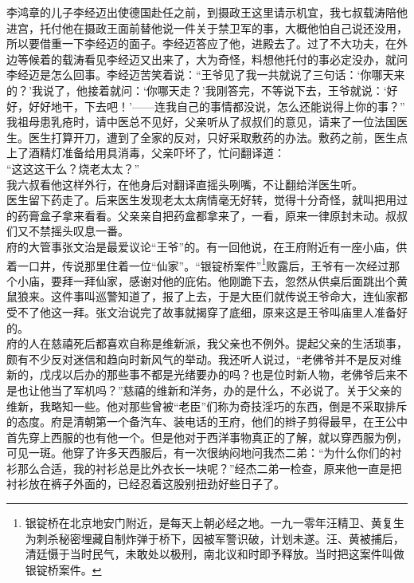 李鸿章的儿子李经迈出使德国赴任之前，到摄政王这里请示机宜，我七叔载涛陪他进宫，托付他在摄政王面前替他说一件关于禁卫军的事，大概他怕自己说还没用，所以要借重一下李经迈的面子。李经迈答应了他，进殿去了。过了不大功夫，在外边等候着的载涛看见李经迈又出来了，大为奇怪，料想他托付的事必定没办，就问李经迈是怎么回事。李经迈苦笑着说：“王爷见了我一共就说了三句话：‘你哪天来的？’我说了，他接着就问：‘你哪天走？’我刚答完，不等说下去，王爷就说：‘好好，好好地干，下去吧！’——连我自己的事情都没说，怎么还能说得上你的事？”\\

我祖母患乳疮时，请中医总不见好，父亲听从了叔叔们的意见，请来了一位法国医生。医生打算开刀，遭到了全家的反对，只好采取敷药的办法。敷药之前，医生点上了酒精灯准备给用具消毒，父亲吓坏了，忙问翻译道：\\

“这这这干么？烧老太太？”\\

我六叔看他这样外行，在他身后对翻译直摇头咧嘴，不让翻给洋医生听。\\

医生留下药走了。后来医生发现老太太病情毫无好转，觉得十分奇怪，就叫把用过的药膏盒子拿来看看。父亲亲自把药盒都拿来了，一看，原来一律原封未动。叔叔们又不禁摇头叹息一番。\\

府的大管事张文治是最爱议论“王爷”的。有一回他说，在王府附近有一座小庙，供着一口井，传说那里住着一位“仙家”。“银锭桥案件”\footnote{银锭桥在北京地安门附近，是每天上朝必经之地。一九一零年汪精卫、黄复生为刺杀秘密埋藏自制炸弹于桥下，因被军警识破，计划未遂。汪、黄被捕后，清廷慑于当时民气，未敢处以极刑，南北议和时即予释放。当时把这案件叫做银锭桥案件。
}败露后，王爷有一次经过那个小庙，要拜一拜仙家，感谢对他的庇佑。他刚跪下去，忽然从供桌后面跳出个黄鼠狼来。这件事叫巡警知道了，报了上去，于是大臣们就传说王爷命大，连仙家都受不了他这一拜。张文治说完了故事就揭穿了底细，原来这是王爷叫庙里人准备好的。\\

府的人在慈禧死后都喜欢自称是维新派，我父亲也不例外。提起父亲的生活琐事，颇有不少反对迷信和趋向时新风气的举动。我还听人说过，“老佛爷并不是反对维新的，戊戌以后办的那些事不都是光绪要办的吗？也是位时新人物，老佛爷后来不是也让他当了军机吗？”慈禧的维新和洋务，办的是什么，不必说了。关于父亲的维新，我略知一些。他对那些曾被“老臣”们称为奇技淫巧的东西，倒是不采取排斥的态度。府是清朝第一个备汽车、装电话的王府，他们的辫子剪得最早，在王公中首先穿上西服的也有他一个。但是他对于西洋事物真正的了解，就以穿西服为例，可见一斑。他穿了许多天西服后，有一次很纳闷地问我杰二弟：“为什么你们的衬衫那么合适，我的衬衫总是比外衣长一块呢？”经杰二弟一检查，原来他一直是把衬衫放在裤子外面的，已经忍着这股别扭劲好些日子了。\\

